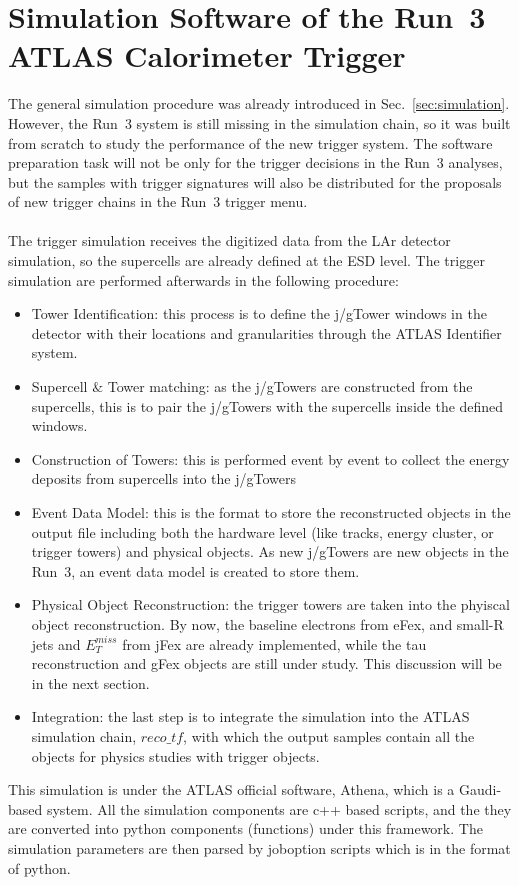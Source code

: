 \section{Simulation Software of the Run~3 ATLAS Calorimeter Trigger}
The general simulation procedure was already introduced in Sec.~\ref{sec:simulation}. However, the Run~3 system is still missing in the simulation chain, so it was built from scratch to study the performance of the new trigger system. The software preparation task will not be only for the trigger decisions in the Run~3 analyses, but the samples with trigger signatures will also be distributed for the proposals of new trigger chains in the Run~3 trigger menu. 
\\
\\The trigger simulation receives the digitized data from the LAr detector simulation, so the supercells are already defined at the ESD level. The trigger simulation are performed afterwards in the following procedure:
\begin{itemize}
	\item Tower Identification: this process is to define the j/gTower windows in the detector with their locations and granularities through the ATLAS Identifier system.
	\item Supercell $\&$ Tower matching: as the j/gTowers are constructed from the supercells, this is to pair the j/gTowers with the supercells inside the defined windows.
	\item Construction of Towers: this is performed event by event to collect the energy deposits from supercells into the j/gTowers
	\item Event Data Model: this is the format to store the reconstructed objects in the output file including both the hardware level (like tracks, energy cluster, or trigger towers) and physical objects. As new j/gTowers are new objects in the Run~3, an event data model is created to store them.
	\item Physical Object Reconstruction: the trigger towers are taken into the phyiscal object reconstruction. By now, the baseline electrons from eFex, and small-R jets and $E^{miss}_{T}$ from jFex are already implemented, while the tau reconstruction and gFex objects are still under study. This discussion will be in the next section. 
	\item Integration: the last step is to integrate the simulation into the ATLAS simulation chain, $reco\_tf$\cite{Stewart:2014ida}, with which the output samples contain all the objects for physics studies with trigger objects. 
\end{itemize}
\noindent
This simulation is under the ATLAS official software, Athena, which is a Gaudi-based system\cite{Mato:2010zz}. All the simulation components are c++ based scripts, and the they are converted into python components (functions) under this framework. The simulation parameters are then parsed by joboption scripts which is in the format of python. 
